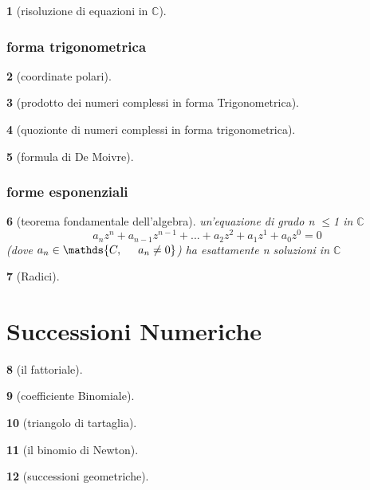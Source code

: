 \documentclass{article}
\theoremstyle{mystyle}
\newtheorem*{mydefinition}{}
\begin{document}
\begin{mydefinition}[risoluzione di equazioni in $\mathds{C}$]
    
\end{mydefinition}
\subsubsection{forma trigonometrica}

\begin{mydefinition}[coordinate polari]
        
\end{mydefinition}

\begin{mydefinition}[prodotto dei numeri complessi in forma Trigonometrica]
    
\end{mydefinition}

\begin{mydefinition}[quozionte di numeri complessi in forma trigonometrica]
    
\end{mydefinition}

\begin{mydefinition}[formula di De Moivre]
    
\end{mydefinition}
\subsubsection{forme esponenziali}


\begin{mydefinition}[teorema fondamentale dell'algebra]
    un'equazione di grado n $\leq$1 in $\mathds{C}$ $$a_nz^n+a_{n-1}z^{n-1}+...+a_2z^2+a_1z^1+a_0z^0=0$$
    (dove $a_n \in \mathds{C, \hspace{0.5cm} a_n \neq 0}$) ha esattamente n soluzioni in $\mathds{C}$
\end{mydefinition}

\begin{mydefinition}[Radici]
    
\end{mydefinition}
\section{Successioni Numeriche}
\begin{mydefinition}[il fattoriale]
    
\end{mydefinition}
\begin{mydefinition}[coefficiente Binomiale]
    
\end{mydefinition}
\begin{mydefinition}[triangolo di tartaglia]
    
\end{mydefinition}
\begin{mydefinition}[il binomio di Newton]
    
\end{mydefinition}
\begin{mydefinition}[successioni geometriche]
    
\end{mydefinition}
\end{document}
